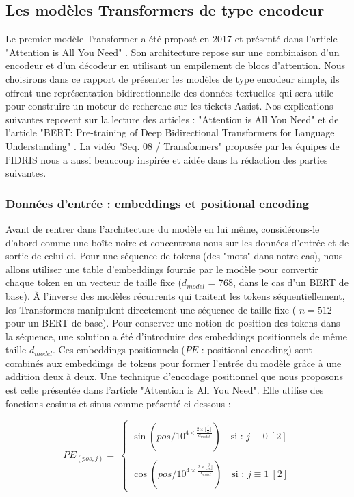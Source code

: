\documentclass[12pt]{article}
\theoremstyle{definition}
\begin{document}
\subsection{Les modèles Transformers de type encodeur}
Le premier modèle Transformer a été proposé en 2017 et présenté dans l’article "Attention is All You Need" \cite{a_i_a_y_n}. Son architecture repose sur une combinaison d'un encodeur et d'un décodeur en utilisant un empilement de blocs d’attention. Nous choisirons dans ce rapport de présenter les modèles de type encodeur simple, ils offrent une représentation bidirectionnelle des données textuelles qui sera utile pour construire un moteur de recherche sur les tickets Assist. Nos explications suivantes reposent sur la lecture des articles : "Attention is All You Need" \cite{a_i_a_y_n} et de l'article "BERT: Pre-training of Deep Bidirectional Transformers for
Language Understanding" \cite{bert_paper}. La vidéo "Seq. 08 / Transformers" proposée par les équipes de l'IDRIS \cite{video_trans} nous a aussi beaucoup inspirée et aidée dans la rédaction des parties suivantes.

\subsubsection{Données d'entrée : embeddings et positional encoding}

Avant de rentrer dans l'architecture du modèle en lui même, considérons-le d'abord comme une boîte noire et concentrons-nous sur les données d’entrée et de sortie de celui-ci. Pour une séquence de tokens (des "mots" dans notre cas), nous allons utiliser une table d'embeddings fournie par le modèle pour convertir chaque token en un vecteur de taille fixe ($d_{model}$ = 768, dans le cas d’un BERT de base). À l’inverse des modèles récurrents qui traitent les tokens séquentiellement, les Transformers manipulent directement une séquence de taille fixe ( $n=512$ pour un BERT de base). Pour conserver une notion de position des tokens dans la séquence, une solution a été d'introduire des embeddings positionnels de même taille $d_{model}$. Ces embeddings positionnels ($PE$ : positional encoding) sont combinés aux embeddings de tokens pour former l'entrée du modèle grâce à une addition deux à deux. Une technique d'encodage positionnel que nous proposons est celle présentée dans l'article "Attention is All You Need". Elle utilise des fonctions cosinus et sinus comme présenté ci dessous :  

$$PE_{(pos,j)} = \ \left\{\begin{array}{c}
	\sin\left(pos/10^{4 \times \frac{2 \times\lfloor \frac{j}{2} \rfloor}{d_{model}}} \right) \quad \text{si  : } j \equiv 0 ~[2]\\\quad\\
	\cos\left(pos/10^{4 \times \frac{2 \times \lfloor \frac{j}{2} \rfloor}{d_{model}}} \right) \quad \text{si  : } j \equiv 1 ~[2]
\end{array}\right.$$
\end{document}
